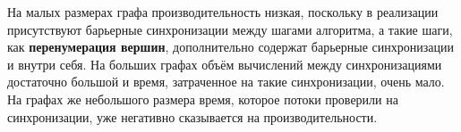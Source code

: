 \documentclass[a4paper,10pt]{extarticle}
\begin{document}
На малых размерах графа производительность низкая, поскольку в реализации присутствуют барьерные синхронизации между шагами алгоритма, а такие шаги, как \textbf{перенумерация вершин}, дополнительно содержат барьерные синхронизации и внутри себя. На больших графах объём вычислений  между синхронизациями достаточно большой и время, затраченное на такие синхронизации, очень мало. На графах же небольшого размера время, которое потоки проверили на синхронизации, уже негативно сказывается на производительности.









\newpage



\end{document}
